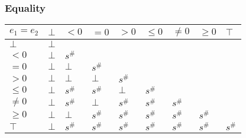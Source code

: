 \documentclass{beamer}
\begin{document}
        \begin{frame}
            \frametitle{Equality}
\begin{table}
    \begin{tabular}{|l|l|l|l|l|l|l|l|l|}
    \hline
    $e_1 = e_2$ & $\bot$ & $<0$   & $=0$   & $>0$   & $\le 0$ & $\ne 0$ & $\ge 0$ & $\top$ \\ \hline
    $\bot$      & $\bot$ &        &        &        &         &         &         &        \\ \hline
    $<0$        & $\bot$ & $s^\#$ &        &        &         &         &         &        \\ \hline
    $=0$        & $\bot$ & $\bot$ & $s^\#$ &        &         &         &         &        \\ \hline
    $>0$        & $\bot$ & $\bot$ & $\bot$ & $s^\#$ &         &         &         &        \\ \hline
    $\le 0$     & $\bot$ & $s^\#$ & $s^\#$ & $\bot$ & $s^\#$  &         &         &        \\ \hline
    $\ne 0$     & $\bot$ & $s^\#$ & $\bot$ & $s^\#$ & $s^\#$  & $s^\#$  &         &        \\ \hline
    $\ge 0$     & $\bot$ & $\bot$ & $s^\#$ & $s^\#$ & $s^\#$  & $s^\#$  & $s^\#$  &        \\ \hline
    $\top$      & $\bot$ & $s^\#$ & $s^\#$ & $s^\#$ & $s^\#$  & $s^\#$  & $s^\#$  & $s^\#$ \\ \hline
    \end{tabular}
    \end{table}
\end{frame}
\end{document}

